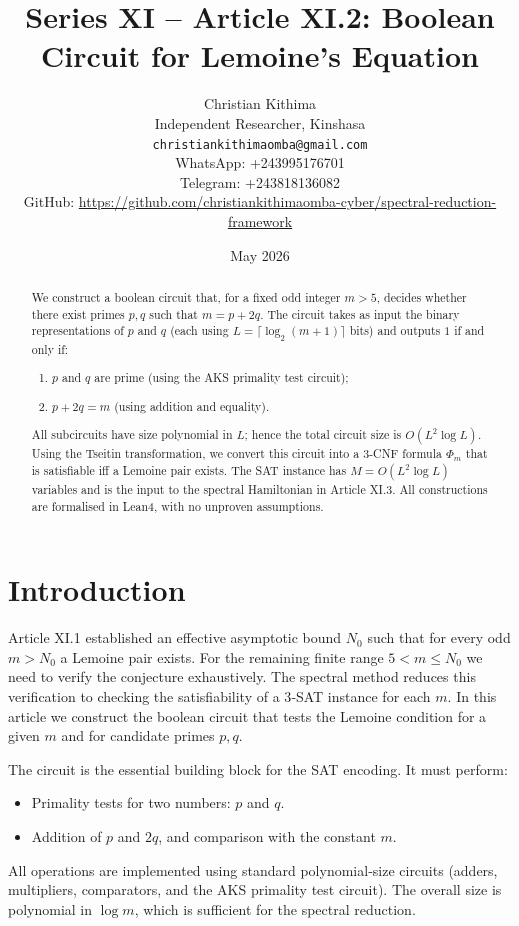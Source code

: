 \documentclass[11pt,a4paper]{article}
\title{Series XI – Article XI.2: Boolean Circuit for Lemoine's Equation}
\author{Christian Kithima \\
Independent Researcher, Kinshasa \\
\texttt{christiankithimaomba@gmail.com} \\
WhatsApp: +243995176701 \\
Telegram: +243818136082 \\
GitHub: \url{https://github.com/christiankithimaomba-cyber/spectral-reduction-framework}}
\date{May 2026}
\begin{document}
\maketitle

\begin{abstract}
We construct a boolean circuit that, for a fixed odd integer \(m > 5\), decides whether there exist primes \(p,q\) such that \(m = p + 2q\). The circuit takes as input the binary representations of \(p\) and \(q\) (each using \(L = \lceil \log_2 (m+1)\rceil\) bits) and outputs \(1\) if and only if:
\begin{enumerate}
\item \(p\) and \(q\) are prime (using the AKS primality test circuit);
\item \(p + 2q = m\) (using addition and equality).
\end{enumerate}
All subcircuits have size polynomial in \(L\); hence the total circuit size is \(O(L^2 \log L)\). Using the Tseitin transformation, we convert this circuit into a 3‑CNF formula \(\Phi_m\) that is satisfiable iff a Lemoine pair exists. The SAT instance has \(M = O(L^2 \log L)\) variables and is the input to the spectral Hamiltonian in Article XI.3. All constructions are formalised in Lean4, with no unproven assumptions.
\end{abstract}

\tableofcontents

\section{Introduction}

Article XI.1 established an effective asymptotic bound \(N_0\) such that for every odd \(m > N_0\) a Lemoine pair exists. For the remaining finite range \(5 < m \le N_0\) we need to verify the conjecture exhaustively. The spectral method reduces this verification to checking the satisfiability of a 3‑SAT instance for each \(m\). In this article we construct the boolean circuit that tests the Lemoine condition for a given \(m\) and for candidate primes \(p,q\).

The circuit is the essential building block for the SAT encoding. It must perform:
\begin{itemize}
\item Primality tests for two numbers: \(p\) and \(q\).
\item Addition of \(p\) and \(2q\), and comparison with the constant \(m\).
\end{itemize}
All operations are implemented using standard polynomial‑size circuits (adders, multipliers, comparators, and the AKS primality test circuit). The overall size is polynomial in \(\log m\), which is sufficient for the spectral reduction.
\end{document}
